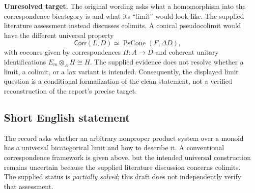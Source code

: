 \documentclass[11pt]{article}
\begin{document}
\textbf{Unresolved target.} The original wording asks what a homomorphism into the correspondence bicategory is and what its ``limit'' would look like. The supplied literature assessment instead discusses colimits. A conical pseudocolimit would have the different universal property
\[
\mathsf{Corr}(L,D)\simeq\operatorname{PsCone}(F,\Delta D),
\]
with cocones given by correspondences \(H:A\to D\) and coherent unitary identifications \(E_m\otimes_A H\cong H\). The supplied evidence does not resolve whether a limit, a colimit, or a lax variant is intended. Consequently, the displayed limit question is a conditional formalization of the clean statement, not a verified reconstruction of the report's precise target.
\subsection{Short English statement}
The record asks whether an arbitrary nonproper product system over a monoid has a universal bicategorical limit and how to describe it. A conventional correspondence framework is given above, but the intended universal construction remains uncertain because the supplied literature discussion concerns colimits. The supplied status is \emph{partially solved}; this draft does not independently verify that assessment.
\end{document}

